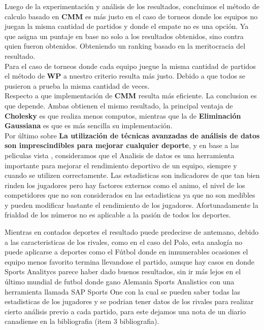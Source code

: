 Luego de la experimentación y análisis de los resultados, concluimos el método de calculo basado en \textbf{CMM} es m\'as justo en el 
caso de torneos donde los equipos no juegan la misma cantidad de partidos y donde el empate no es una opción. Ya que asigna un puntaje 
en base no solo a los resultados obtenidos, sino contra quien fueron obtenidos. Obteniendo un ranking basado en la meritocracia del resultado. \\

Para el caso de torneos donde cada equipo juegue la misma cantidad de partidos el método de \textbf{WP} a nuestro criterio resulta m\'as justo. 
Debido a que todos se pusieron a prueba la misma cantidad de veces. \\

Respecto a que implementación de \textbf{CMM} resulta m\'as eficiente. La conclusion es que depende. Ambas obtienen el mismo resultado, 
la principal ventaja de \textbf{Cholesky} es que realiza menos computos, mientras que la de \textbf{Eliminación Gaussiana} es que es m\'as 
sencilla su implementación. \\

Por último sobre \textbf{La utilización de técnicas avanzadas de análisis de datos son imprescindibles para mejorar cualquier deporte}, 
 y en base a las peliculas vista , consideramos que el Analisis de datos es una herramienta importante para mejorar el rendimiento deportivo de un equipo, 
siempre y cuando se utilizen correctamente. 
Las estadisticas son indicadores de que tan bien rinden los jugadores pero hay factores externos como el animo, el nivel de los competidores 
que no son considerados en las estadisticas ya que no son medibles y pueden modificar bastante el rendimiento de los jugadores.
Afortunadamente la frialdad de los números no es aplicable a la pasión de todos los deportes. 

Mientras en contados deportes el resultado puede predecirse de antemano, debido a las caracteristicas de los rivales, como en el caso del Polo, 
esta analogía no puede aplicarse a deportes como el Fútbol donde en innumerables ocasiones el equipo menos favorito termina llevandose el partido, aunque hay casos en donde
Sports Analitycs parece haber dado buenos resultados, sin ir m\'as lejos en el \'ultimo mundial de futbol donde gano Alemania Sports Analistics
con una herramienta llamada SAP Sports One con la cual se pueden saber todas las estadisticas de los jugadores y se podrian tener datos de los rivales para realizar
cierto an\'alisis previo a cada partido, para este dejamos una nota de un diario canadiense en la bibliografia (item 3 bibliografia).
